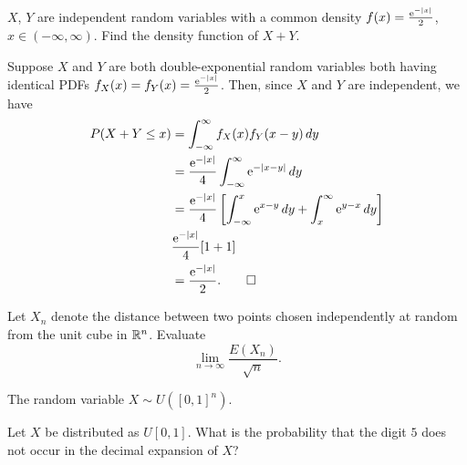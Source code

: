 \begin{problem}
  \(X\), \(Y\) are independent random variables with a common density
  \(f(x)=\frac{\mathrm{e}^{-|x|}}{2}\), \(x\in(-\infty,\infty)\). Find the
  density function of \(X+Y\).
\end{problem}
\begin{solution*}
  Suppose \(X\) and \(Y\) are both double-exponential random variables both
  having identical PDFs \(f_X(x)=f_Y(x)=\frac{\mathrm{e}^{-|x|}}{2}\). Then,
  since \(X\) and \(Y\) are independent, we have
  \begin{align*}
    P(X+Y\leq x)
    &=\int_{-\infty}^\infty f_X(x)f_Y(x-y)\mathop{}\!d y\\
    &=\frac{\mathrm{e}^{-|x|}}{4}\int_{-\infty}^\infty\mathrm{e}^{-|x-y|}\mathop{}\!d y\\
    &=\frac{\mathrm{e}^{-|x|}}{4}
      \left[
      \int_{-\infty}^x\mathrm{e}^{x-y}\mathop{}\!d y
      +\int_x^\infty\mathrm{e}^{y-x}\mathop{}\!d y
      \right]\\
    &\frac{\mathrm{e}^{-|x|}}{4}[1+1]\\
    &=\frac{\mathrm{e}^{-|x|}}{2}.\qedhere
  \end{align*}
\end{solution*}

\begin{problem}
  Let \(X_n\) denote the distance between two points chosen independently
  at random from the unit cube in \(\mathbb{R}^n\). Evaluate
  \[
    \lim_{n\to\infty}\frac{E(X_n)}{\sqrt{n}}.
  \]
\end{problem}
\begin{solution*}
  The random variable \(X\sim U([0,1]^n)\).
\end{solution*}

\begin{problem}
  Let \(X\) be distributed as \(U[0,1]\). What is the probability that the
  digit \(5\) does not occur in the decimal expansion of \(X\)?
\end{problem}
\begin{solution*}
\end{solution*}

